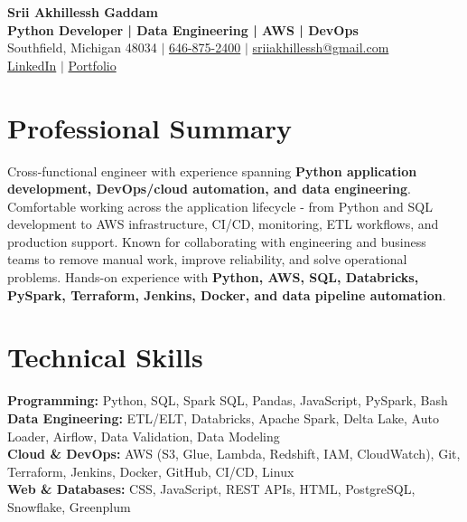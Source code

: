 \documentclass[letterpaper,10pt]{article}
\begin{document}
\fontsize{9.35pt}{10.45pt}\selectfont

\begin{center}
    {\LARGE \textbf{Srii Akhillessh Gaddam}} \\[-1pt]
    \textbf{Python Developer | Data Engineering | AWS | DevOps} \\[2pt]
    Southfield, Michigan 48034 $|$
    \href{tel:6468752400}{646-875-2400} $|$
    \href{mailto:sriiakhillessh@gmail.com}{sriiakhillessh@gmail.com} \\[1pt]
    \href{https://www.linkedin.com/in/srii-akhiilessh-gaddam-b48668191/}{LinkedIn} $|$
    \href{https://sriiakhillesshg.github.io/portfolio/}{Portfolio}
\end{center}
\vspace{-8pt}

\section{Professional Summary}
\small{Cross-functional engineer with experience spanning \textbf{Python application development, DevOps/cloud automation, and data engineering}. Comfortable working across the application lifecycle - from Python and SQL development to AWS infrastructure, CI/CD, monitoring, ETL workflows, and production support. Known for collaborating with engineering and business teams to remove manual work, improve reliability, and solve operational problems. Hands-on experience with \textbf{Python, AWS, SQL, Databricks, PySpark, Terraform, Jenkins, Docker, and data pipeline automation}.}

\section{Technical Skills}
\small{
\textbf{Programming:} Python, SQL, Spark SQL, Pandas, JavaScript, PySpark, Bash \\
\textbf{Data Engineering:} ETL/ELT, Databricks, Apache Spark, Delta Lake, Auto Loader, Airflow, Data Validation, Data Modeling \\
\textbf{Cloud \& DevOps:} AWS (S3, Glue, Lambda, Redshift, IAM, CloudWatch), Git, Terraform, Jenkins, Docker, GitHub, CI/CD, Linux \\
\textbf{Web \& Databases:} CSS, JavaScript, REST APIs, HTML, PostgreSQL, Snowflake, Greenplum
}
\end{document}
